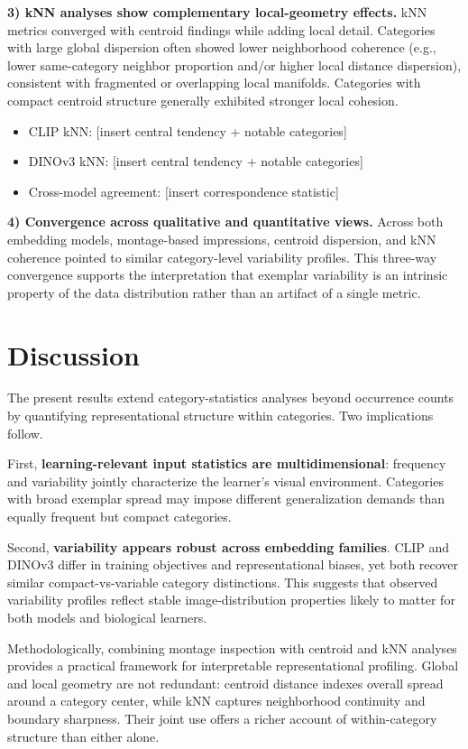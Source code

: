 \documentclass[11pt]{article}
\begin{document}
\textbf{3) kNN analyses show complementary local-geometry effects.}
kNN metrics converged with centroid findings while adding local detail. Categories with large global dispersion often showed lower neighborhood coherence (e.g., lower same-category neighbor proportion and/or higher local distance dispersion), consistent with fragmented or overlapping local manifolds. Categories with compact centroid structure generally exhibited stronger local cohesion.
\begin{itemize}
  \item CLIP kNN: [insert central tendency + notable categories]
  \item DINOv3 kNN: [insert central tendency + notable categories]
  \item Cross-model agreement: [insert correspondence statistic]
\end{itemize}

\textbf{4) Convergence across qualitative and quantitative views.}
Across both embedding models, montage-based impressions, centroid dispersion, and kNN coherence pointed to similar category-level variability profiles. This three-way convergence supports the interpretation that exemplar variability is an intrinsic property of the data distribution rather than an artifact of a single metric.

\section*{Discussion}
The present results extend category-statistics analyses beyond occurrence counts by quantifying representational structure within categories. Two implications follow.

First, \textbf{learning-relevant input statistics are multidimensional}: frequency and variability jointly characterize the learner's visual environment. Categories with broad exemplar spread may impose different generalization demands than equally frequent but compact categories.

Second, \textbf{variability appears robust across embedding families}. CLIP and DINOv3 differ in training objectives and representational biases, yet both recover similar compact-vs-variable category distinctions. This suggests that observed variability profiles reflect stable image-distribution properties likely to matter for both models and biological learners.

Methodologically, combining montage inspection with centroid and kNN analyses provides a practical framework for interpretable representational profiling. Global and local geometry are not redundant: centroid distance indexes overall spread around a category center, while kNN captures neighborhood continuity and boundary sharpness. Their joint use offers a richer account of within-category structure than either alone.
\end{document}
